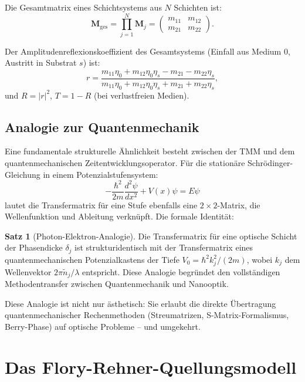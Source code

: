 ﻿\documentclass[a4paper,12pt]{scrreprt}
\theoremstyle{definition}
\newtheorem{satz}{Satz}[section]
\newcommand{\matr}[1]{\mathbf{#1}}
\begin{document}
Die Gesamtmatrix eines Schichtsystems aus $N$ Schichten ist:
\begin{equation}
  \matr{M}_{\mathrm{ges}} = \prod_{j=1}^{N} \matr{M}_j =
  \begin{pmatrix} m_{11} & m_{12} \\ m_{21} & m_{22} \end{pmatrix}.
\end{equation}

Der Amplitudenreflexionskoeffizient des Gesamtsystems (Einfall aus Medium 0,
Austritt in Substrat $s$) ist:
\begin{equation}
  r = \frac{m_{11}\eta_0 + m_{12}\eta_0\eta_s - m_{21} - m_{22}\eta_s}
  {m_{11}\eta_0 + m_{12}\eta_0\eta_s + m_{21} + m_{22}\eta_s},
\end{equation}
und $R = |r|^2$, $T = 1 - R$ (bei verlustfreien Medien).

\subsection{Analogie zur Quantenmechanik}

Eine fundamentale strukturelle Ähnlichkeit besteht zwischen der TMM und dem
quantenmechanischen Zeitentwicklungsoperator. Für die stationäre
Schrödinger-Gleichung in einem Potenzialstufensystem:
\begin{equation}
  -\frac{\hbar^2}{2m}\frac{d^2\psi}{dx^2} + V(x)\psi = E\psi
\end{equation}
lautet die Transfermatrix für eine Stufe ebenfalls eine $2\times 2$-Matrix,
die Wellenfunktion und Ableitung verknüpft. Die formale Identität:

\begin{satz}[Photon-Elektron-Analogie]
  Die Transfermatrix für eine optische Schicht der Phasendicke $\delta_j$ ist
  strukturidentisch mit der Transfermatrix eines quantenmechanischen
  Potenzialkastens der Tiefe $V_0 = \hbar^2 k_j^2/(2m)$, wobei $k_j$ dem
  Wellenvektor $2\pi \tilde{n}_j/\lambda$ entspricht. Diese Analogie begründet
  den vollständigen Methodentransfer zwischen Quantenmechanik und Nanooptik.
\end{satz}

Diese Analogie ist nicht nur ästhetisch: Sie erlaubt die direkte Übertragung
quantenmechanischer Rechenmethoden (Streumatrizen, S-Matrix-Formalismus,
Berry-Phase) auf optische Probleme -- und umgekehrt.

\section{Das Flory-Rehner-Quellungsmodell}
\end{document}
